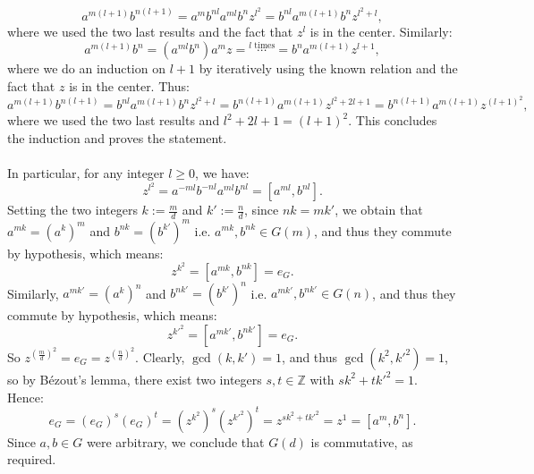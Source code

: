 \documentclass[11pt, a4paper, oneside]{article}
\theoremstyle{remark}
\theoremstyle{lemma}
\begin{document}
\[
a^{m(l+1)} b^{n(l+1)}=a^m b^{nl} a^{ml} b^n z^{l^2}=b^{nl} a^{m(l+1)} b^n z^{l^2+l},
\]
where we used the two last results and the fact that $z^l$ is in the center. Similarly:
\[
a^{m(l+1)} b^{n}=\left(a^{ml} b^n\right) a^m z=\overset{l\text{ times}}{\cdots}=b^{n} a^{m(l+1)} z^{l+1},
\]
where we do an induction on $l+1$ by iteratively using the known relation and the fact that $z$ is in the center. Thus:
\[
a^{m(l+1)} b^{n(l+1)}=b^{nl} a^{m(l+1)} b^n z^{l^2+l}=b^{n(l+1)} a^{m(l+1)} z^{l^2+2l+1}=b^{n(l+1)} a^{m(l+1)} z^{(l+1)^2},
\]
where we used the two last results and $l^2+2l+1=(l+1)^2$. This concludes the induction and proves the statement.
\\\\
In particular, for any integer $l\geq 0$, we have:
\[
z^{l^2}=a^{-ml} b^{-nl} a^{ml} b^{nl}=[a^{ml}, b^{nl}].
\]
Setting the two integers \( k := \frac{m}{d} \) and $k':=\frac{n}{d}$, since $nk=mk'$, we obtain that $a^{mk}=(a^k)^{m}$ and $b^{nk}=(b^{k'})^{m}$ i.e. $a^{mk},b^{nk}\in G(m)$, and thus they commute by hypothesis, which means:
\[
z^{k^2}=[a^{mk}, b^{nk}] = e_G.
\]
Similarly, $a^{mk'}=(a^k)^{n}$ and $b^{nk'}=(b^{k'})^{n}$ i.e. $a^{mk'},b^{nk'}\in G(n)$, and thus they commute by hypothesis, which means:
\[
z^{k'^2}=[a^{mk'}, b^{nk'}] = e_G.
\]
So $z^{\left(\frac{m}{d}\right)^2}=e_G=z^{\left(\frac{n}{d}\right)^2}$. Clearly, $\gcd(k,k')=1$, and thus $\gcd(k^2,k'^2)=1$, so by Bézout's lemma, there exist two integers $s,t\in\mathbb{Z}$ with $s k^2 + t k'^2=1$. Hence:
\[
e_G=(e_G)^s (e_G)^t=\left(z^{k^2}\right)^s \left(z^{k'^2}\right)^t=z^{s k^2 + t k'^2}=z^1=[a^m, b^n].
\]
Since $a,b\in G$ were arbitrary, we conclude that \( G(d) \) is commutative, as required.
\end{document}
